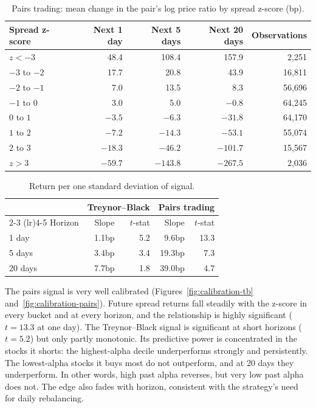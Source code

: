 \documentclass[12pt,letterpaper]{article}
\begin{document}
\begin{table}[H]
\centering
\caption{Pairs trading: mean change in the pair's log price ratio by spread z-score (bp).}
\label{tab:calibration-pairs}
\begin{tabular}{lrrrr}
\toprule
Spread z-score & Next 1 day & Next 5 days & Next 20 days & Observations \\
\midrule
$z < -3$ & 48.4 & 108.4 & 157.9 & 2,251 \\
$-3$ to $-2$ & 17.7 & 20.8 & 43.9 & 16,811 \\
$-2$ to $-1$ & 7.0 & 13.5 & 8.3 & 56,696 \\
$-1$ to $0$ & 3.0 & 5.0 & $-0.8$ & 64,245 \\
$0$ to $1$ & $-3.5$ & $-6.3$ & $-31.8$ & 64,170 \\
$1$ to $2$ & $-7.2$ & $-14.3$ & $-53.1$ & 55,074 \\
$2$ to $3$ & $-18.3$ & $-46.2$ & $-101.7$ & 15,567 \\
$z > 3$ & $-59.7$ & $-143.8$ & $-267.5$ & 2,036 \\
\bottomrule
\end{tabular}
\end{table}

\begin{table}[H]
\centering
\caption{Return per one standard deviation of signal.}
\label{tab:calibration-slopes}
\begin{tabular}{lrrrr}
\toprule
& \multicolumn{2}{c}{Treynor--Black} & \multicolumn{2}{c}{Pairs trading} \\
\cmidrule(lr){2-3} \cmidrule(lr){4-5}
Horizon & Slope & $t$-stat & Slope & $t$-stat \\
\midrule
1 day & 1.1bp & 5.2 & 9.6bp & 13.3 \\
5 days & 3.4bp & 3.4 & 19.3bp & 7.3 \\
20 days & 7.7bp & 1.8 & 39.0bp & 4.7 \\
\bottomrule
\end{tabular}
\end{table}

The pairs signal is very well calibrated (Figures~\ref{fig:calibration-tb} and~\ref{fig:calibration-pairs}). Future spread returns fall steadily with the z-score in every bucket and at every horizon, and the relationship is highly significant ($t = 13.3$ at one day). The Treynor--Black signal is significant at short horizons ($t = 5.2$) but only partly monotonic. Its predictive power is concentrated in the stocks it shorts: the highest-alpha decile underperforms strongly and persistently. The lowest-alpha stocks it buys most do not outperform, and at 20 days they underperform. In other words, high past alpha reverses, but very low past alpha does not. The edge also fades with horizon, consistent with the strategy's need for daily rebalancing.
\end{document}
